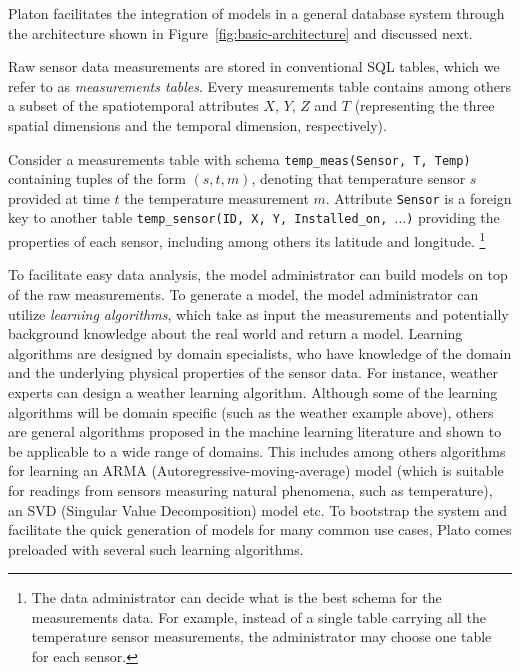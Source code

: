 Platon facilitates the integration of models in a general database system through the architecture shown in Figure~\ref{fig:basic-architecture} and discussed next.

Raw sensor data measurements are stored in conventional SQL tables, which we refer to as {\em measurements tables}. Every measurements table contains among others a subset of the spatiotemporal attributes $X$, $Y$, $Z$ and $T$ (representing the three spatial dimensions and the temporal dimension, respectively).

\vspace*{0.5cm}
\begin{example}
Consider a measurements table with schema \texttt{temp\_meas(Sensor, T, Temp)} containing tuples of the form $(s, t, m)$, denoting that temperature sensor $s$ provided at time $t$ the temperature measurement $m$.
Attribute \texttt{Sensor} is a foreign key to another table \texttt{temp\_sensor(ID, X, Y, Installed\_on, $\ldots$)} providing the properties of each sensor, including among others its latitude and longitude.
\footnote{The data administrator can decide what is the best schema for the measurements data. For example, instead of a single table carrying all the temperature sensor measurements, the administrator may choose one table for each sensor.
}
\end{example}
\vspace*{0.5cm}

To facilitate easy data analysis, the model administrator can build models on top of the raw measurements. To generate a model, the model administrator can utilize {\em learning algorithms}, which take as input the measurements and potentially background knowledge about the real world and return a model. Learning algorithms are designed by domain specialists, who have knowledge of the domain and the underlying physical properties of the sensor data. For instance, weather experts can design a weather learning algorithm. Although some of the learning algorithms will be domain specific (such as the weather example above), others are general algorithms proposed in the machine learning literature  and shown to be applicable to a wide range of domains. This includes among others algorithms for learning an ARMA (Autoregressive-moving-average) model (which is suitable for readings from sensors measuring natural phenomena, such as temperature), an SVD (Singular Value Decomposition) model etc. To bootstrap the system and facilitate the quick generation of models for many common use cases, Plato comes preloaded with several such learning algorithms.

